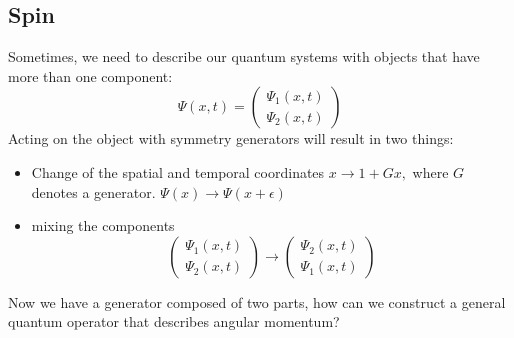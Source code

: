 \subsection{Spin}
Sometimes, we need to describe our quantum systems with objects that have more than one component:
$$
\Psi(x, t)=\left(\begin{array}{l}
{\Psi_{1}(x, t)} \\
{\Psi_{2}(x, t)}
\end{array}\right)
$$
Acting on the object with symmetry generators will result in two things:
\begin{qt}
\begin{itemize}
    \item Change of the spatial and temporal coordinates $x \rightarrow 1+G x,$ where $G$ denotes a generator.
$\Psi(x) \rightarrow \Psi(x+\epsilon)$
    \item mixing the components
    $$
\left(\begin{array}{l}
{\Psi_{1}(x, t)} \\
{\Psi_{2}(x, t)}
\end{array}\right) \rightarrow\left(\begin{array}{l}
{\Psi_{2}(x, t)} \\
{\Psi_{1}(x, t)}
\end{array}\right)
$$
\end{itemize}
\end{qt}
\begin{mybox}
\begin{center}
    Now we have a generator composed of two parts, how can we construct a general quantum operator that describes angular momentum?
\end{center}
\end{mybox}
